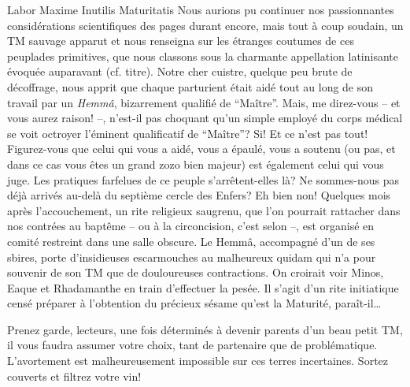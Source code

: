 \begin{article}{Labor Maxime Inutilis Maturitatis}
Nous aurions pu continuer nos passionnantes considérations scientifiques des pages durant encore, mais tout à coup soudain, un TM sauvage apparut et nous renseigna sur les étranges coutumes de ces peuplades primitives, que nous classons sous la charmante appellation latinisante évoquée auparavant (cf. titre). Notre cher cuistre, quelque peu brute de décoffrage, nous apprit que chaque parturient était aidé tout au long de son travail par un \textit{Hemmâ}, bizarrement qualifié de \enquote{Maître}. Mais, me direz-vous – et vous aurez raison! –, n’est-il pas choquant qu’un simple employé du corps médical se voit octroyer l’éminent qualificatif de \enquote{Maître}? Si! Et ce n’est pas tout! Figurez-vous que celui qui vous a aidé, vous a épaulé, vous a soutenu (ou pas, et dans ce cas vous êtes un grand zozo bien majeur) est également celui qui vous juge.
Les pratiques farfelues de ce peuple s’arrêtent-elles là? Ne sommes-nous pas déjà arrivés au-delà du septième cercle des Enfers? Eh bien non! Quelques mois après l’accouchement, un rite religieux saugrenu, que l’on pourrait rattacher dans nos contrées au baptême – ou à la circoncision, c’est selon –, est organisé en comité restreint dans une salle obscure. Le Hemmâ, accompagné d’un de ses sbires, porte d’insidieuses escarmouches au malheureux quidam qui n’a pour souvenir de son TM que de douloureuses contractions. On croirait voir Minos, Eaque et Rhadamanthe en train d’effectuer la pesée. Il s’agit d’un rite initiatique censé préparer à l’obtention du précieux sésame qu’est la Maturité, paraît-il…

Prenez garde, lecteurs, une fois déterminés à devenir parents d’un beau petit TM, il vous faudra assumer votre choix, tant de partenaire que de problématique. L’avortement est malheureusement impossible sur ces terres incertaines. Sortez couverts et filtrez votre vin!
\end{article}

\ligne




